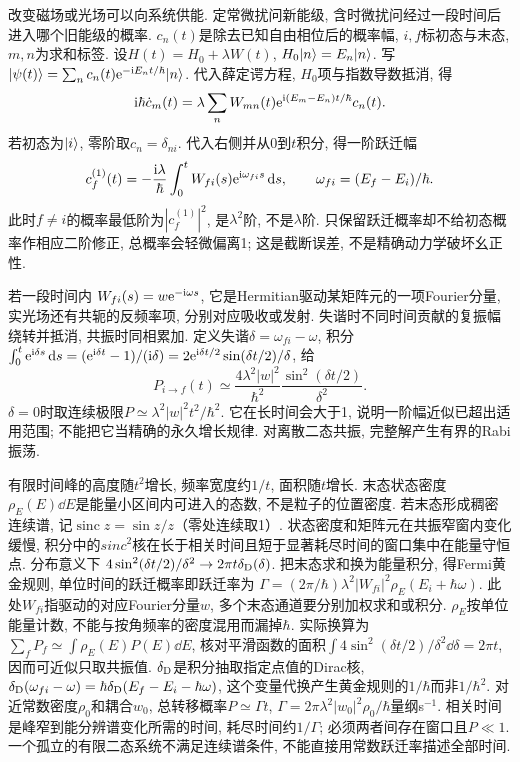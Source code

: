 改变磁场或光场可以向系统供能. 定常微扰问新能级, 含时微扰问经过一段时间后进入哪个旧能级的概率. $c_n(t)$是除去已知自由相位后的概率幅, $i,f$标初态与末态,$m,n$为求和标签. 设$H(t)=H_0+\lambda W(t)$, $H_0\lvert n\rangle=E_n\lvert n\rangle$. 写$\lvert \psi(t)\rangle=\sum_n c_n(t)\mathrm e^{-\mathrm i E_nt/\hbar}\lvert n\rangle$. 代入薛定谔方程, $H_0$项与指数导数抵消, 得
\[
\mathrm i\hbar\dot c_m(t)=\lambda\sum_nW_{mn}(t)
\mathrm e^{\mathrm i(E_m-E_n)t/\hbar}c_n(t).
\]
若初态为$\lvert i\rangle$, 零阶取$c_n=\delta_{ni}$. 代入右侧并从0到$t$积分, 得一阶跃迁幅
\[
c_f^{(1)}(t)=-\frac{\mathrm i\lambda}{\hbar}\int_0^t
W_{fi}(s)\mathrm e^{\mathrm i\omega_{fi}s}\,\mathrm d s,
\qquad \omega_{fi}=(E_f-E_i)/\hbar.
\]
此时$f\ne i$的概率最低阶为$|c_f^{(1)}|^2$, 是$\lambda^2$阶, 不是$\lambda$阶. 只保留跃迁概率却不给初态概率作相应二阶修正, 总概率会轻微偏离1; 这是截断误差, 不是精确动力学破坏幺正性.

若一段时间内 $W_{fi}(s)=w\mathrm e^{-\mathrm i\omega s}$, 它是Hermitian驱动某矩阵元的一项Fourier分量, 实光场还有共轭的反频率项, 分别对应吸收或发射. 失谐时不同时间贡献的复振幅绕转并抵消, 共振时同相累加. 定义失谐$\delta=\omega_{fi}-\omega$, 积分$\int_0^t\mathrm e^{\mathrm i\delta s}\,\mathrm d s=(\mathrm e^{\mathrm i\delta t}-1)/(\mathrm i\delta)=2\mathrm e^{\mathrm i\delta t/2}\sin(\delta t/2)/\delta$, 给
\[
P_{i\to f}(t)\simeq\frac{4\lambda^2|w|^2}{\hbar^2}
\frac{\sin^2(\delta t/2)}{\delta^2}.
\]
$\delta=0$时取连续极限$P\simeq\lambda^2|w|^2t^2/\hbar^2$. 它在长时间会大于1, 说明一阶幅近似已超出适用范围; 不能把它当精确的永久增长规律. 对离散二态共振, 完整解产生有界的Rabi振荡.

有限时间峰的高度随$t^2$增长, 频率宽度约$1/t$, 面积随$t$增长. 末态状态密度$\rho_E(E)\dd E$是能量小区间内可进入的态数, 不是粒子的位置密度. 若末态形成稠密连续谱, 记$\operatorname{sinc}z=\sin z/z$（零处连续取1）. 状态密度和矩阵元在共振窄窗内变化缓慢, 积分中的$sinc^2$核在长于相关时间且短于显著耗尽时间的窗口集中在能量守恒点. 分布意义下
$4\sin^2(\delta t/2)/\delta^2\to2\pi t\delta_{\rm D}(\delta)$.
把末态求和换为能量积分, 得Fermi黄金规则, 单位时间的跃迁概率即跃迁率为 $\Gamma=(2\pi/\hbar)\lambda^2|W_{fi}|^2\rho_E(E_i+\hbar\omega)$. 此处$W_{fi}$指驱动的对应Fourier分量$w$, 多个末态通道要分别加权求和或积分. $\rho_E$按单位能量计数, 不能与按角频率的密度混用而漏掉$\hbar$. 实际换算为$\sum_fP_f\simeq\int\rho_E(E)P(E)\dd E$, 核对平滑函数的面积$\int4\sin^2(\delta t/2)/\delta^2\dd\delta=2\pi t$, 因而可近似只取共振值. $\delta_{\rm D}$是积分抽取指定点值的Dirac核,$\delta_{\rm D}(\omega_{fi}-\omega)=\hbar\delta_{\rm D}(E_f-E_i-\hbar\omega)$, 这个变量代换产生黄金规则的$1/\hbar$而非$1/\hbar^2$. 对近常数密度$\rho_0$和耦合$w_0$, 总转移概率$P\simeq\Gamma t$, $\Gamma=2\pi\lambda^2|w_0|^2\rho_0/\hbar$量纲s$^{-1}$. 相关时间是峰窄到能分辨谱变化所需的时间, 耗尽时间约$1/\Gamma$; 必须两者间存在窗口且$P\ll1$. 一个孤立的有限二态系统不满足连续谱条件, 不能直接用常数跃迁率描述全部时间.

